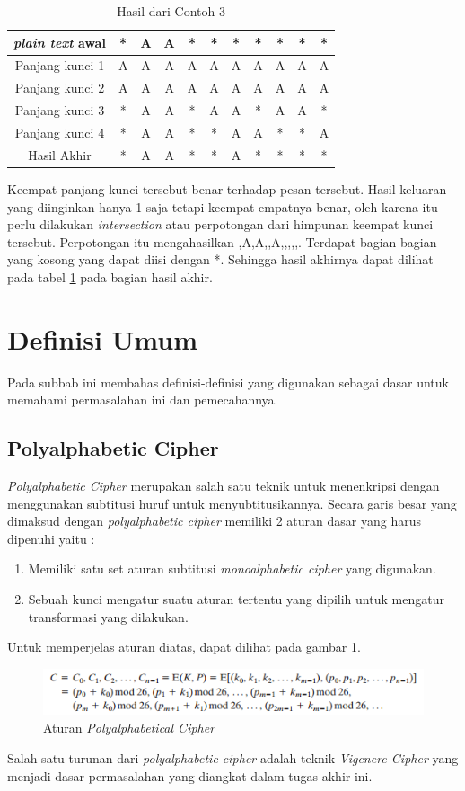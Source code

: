 	\begin{table}[H]
		\centering
		\begin{tabular}{|c|c|c|c|c|c|c|c|c|c|c|}\hline
		\textit{plain text} awal&*&A&A&*&*&*&*&*&*&*\\ \hline
		Panjang kunci 1 &A&A&A&A&A&A&A&A&A&A\\ \hline
		Panjang kunci 2 &A&A&A&A&A&A&A&A&A&A\\ \hline
		Panjang kunci 3 &*&A&A&*&A&A&*&A&A&*\\ \hline
		Panjang kunci 4 &*&A&A&*&*&A&A&*&*&A\\ \hline
		Hasil Akhir     &*&A&A&*&*&A&*&*&*&*\\ \hline
		\end{tabular}
		\caption{Hasil dari Contoh 3}
		\label{tab:res_contoh_3}
	\end{table}
	Keempat panjang kunci tersebut benar terhadap pesan tersebut. Hasil keluaran yang diinginkan hanya 1 saja tetapi keempat-empatnya benar, oleh karena itu perlu dilakukan \textit{intersection} atau perpotongan dari himpunan keempat kunci tersebut. Perpotongan itu mengahasilkan {,A,A,,A,,,,,}. Terdapat bagian bagian yang kosong yang dapat  diisi dengan *. Sehingga hasil akhirnya dapat dilihat pada tabel \ref{tab:res_contoh_3} pada bagian hasil akhir.
	
	\section{Definisi Umum}
	Pada subbab ini membahas definisi-definisi yang digunakan sebagai dasar untuk memahami permasalahan ini dan pemecahannya.	
	\subsection{Polyalphabetic Cipher}
	\textit{Polyalphabetic Cipher }merupakan salah satu teknik untuk menenkripsi dengan menggunakan subtitusi huruf untuk menyubtitusikannya. Secara garis besar yang dimaksud dengan \textit{polyalphabetic cipher} memiliki 2 aturan dasar yang harus dipenuhi yaitu :
	\begin{enumerate}
		\item Memiliki satu set aturan subtitusi \textit{monoalphabetic cipher} yang digunakan.
		\item Sebuah kunci mengatur suatu aturan tertentu yang dipilih untuk mengatur transformasi yang dilakukan.
	\end{enumerate}
	Untuk memperjelas aturan diatas, dapat dilihat pada gambar \ref{fig:polyalphabeticalcipher}.
	\begin{figure}[H]
		\centering
		\includegraphics[scale=0.85]{images/bab2/poly.png}
		\caption{Aturan \textit{Polyalphabetical Cipher}}
		\label{fig:polyalphabeticalcipher}
	\end{figure}
	Salah satu turunan dari \textit{polyalphabetic cipher} adalah teknik \textit{Vigenere Cipher} yang menjadi dasar permasalahan yang diangkat dalam tugas akhir ini.\cite{stallings_computer_2015}
	
